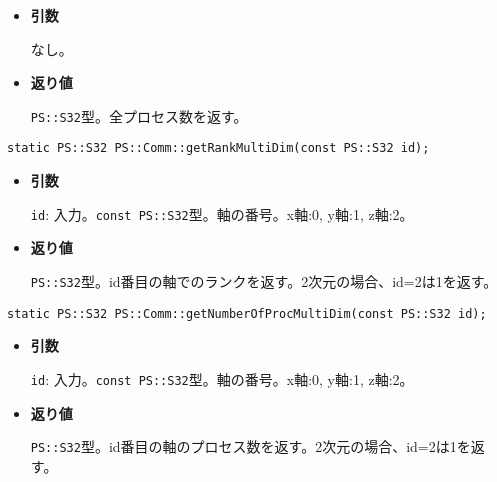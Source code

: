 
\begin{itemize}

\item{{\bf 引数}}

なし。

\item{{\bf 返り値}}

{\tt PS::S32}型。全プロセス数を返す。

\end{itemize}


\begin{screen}
\begin{verbatim}
static PS::S32 PS::Comm::getRankMultiDim(const PS::S32 id);
\end{verbatim}
\end{screen}

\begin{itemize}

\item{{\bf 引数}}

{\tt id}: 入力。{\tt const PS::S32}型。軸の番号。x軸:0, y軸:1, z軸:2。

\item{{\bf 返り値}}

{\tt PS::S32}型。id番目の軸でのランクを返す。2次元の場合、id=2は1を返す。

\end{itemize}


\begin{screen}
\begin{verbatim}
static PS::S32 PS::Comm::getNumberOfProcMultiDim(const PS::S32 id);
\end{verbatim}
\end{screen}

\begin{itemize}

\item{{\bf 引数}}

{\tt id}: 入力。{\tt const PS::S32}型。軸の番号。x軸:0, y軸:1, z軸:2。

\item{{\bf 返り値}}

{\tt PS::S32}型。id番目の軸のプロセス数を返す。2次元の場合、id=2は1を返す。

\end{itemize}

